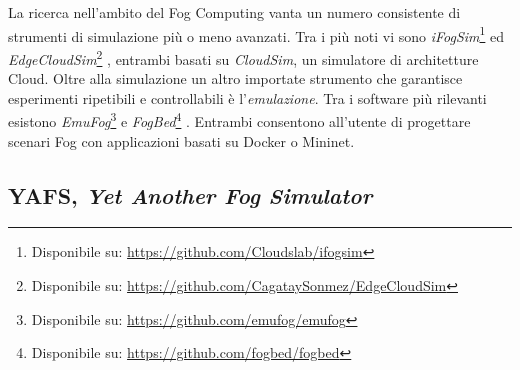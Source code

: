 La ricerca nell'ambito del Fog Computing vanta un numero consistente di strumenti di simulazione più o meno avanzati. Tra i più noti vi sono \textit{iFogSim}\footnote{Disponibile su: \url{https://github.com/Cloudslab/ifogsim}} \cite{iFogSim} ed \textit{EdgeCloudSim}\footnote{Disponibile su: \url{https://github.com/CagataySonmez/EdgeCloudSim}} \cite{EdgeCloudSim}, entrambi basati su \textit{CloudSim}, un simulatore di architetture Cloud. Oltre alla simulazione un altro importate strumento che garantisce esperimenti ripetibili e controllabili è l'\textit{emulazione}. Tra i software più rilevanti esistono \textit{EmuFog}\footnote{Disponibile su: \url{https://github.com/emufog/emufog}} \cite{EmuFog} e \textit{FogBed}\footnote{Disponibile su: \url{https://github.com/fogbed/fogbed}} \cite{FogBed}. Entrambi consentono all'utente di progettare scenari Fog con applicazioni basati su Docker o Mininet.

\subsection{YAFS, \textit{Yet Another Fog Simulator}}

